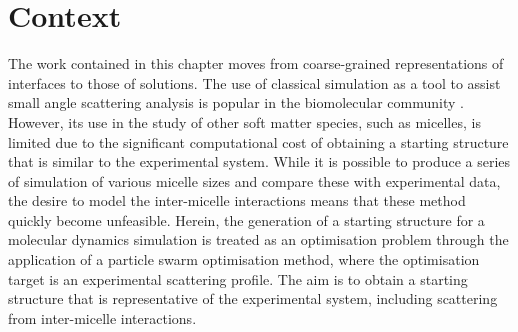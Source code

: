 \section*{Context}
The work contained in this chapter moves from coarse-grained representations of interfaces to those of solutions.
The use of classical simulation as a tool to assist small angle scattering analysis is popular in the biomolecular community \cite{perkins_atomistic_2016,hub_interpreting_2018}.
However, its use in the study of other soft matter species, such as micelles, is limited due to the significant computational cost of obtaining a starting structure that is similar to the experimental system.
While it is possible to produce a series of simulation of various micelle sizes and compare these with experimental data, the desire to model the inter-micelle interactions means that these method quickly become unfeasible.
Herein, the generation of a starting structure for a molecular dynamics simulation is treated as an optimisation problem through the application of a particle swarm optimisation method, where the optimisation target is an experimental scattering profile.
The aim is to obtain a starting structure that is representative of the experimental system, including scattering from inter-micelle interactions.
